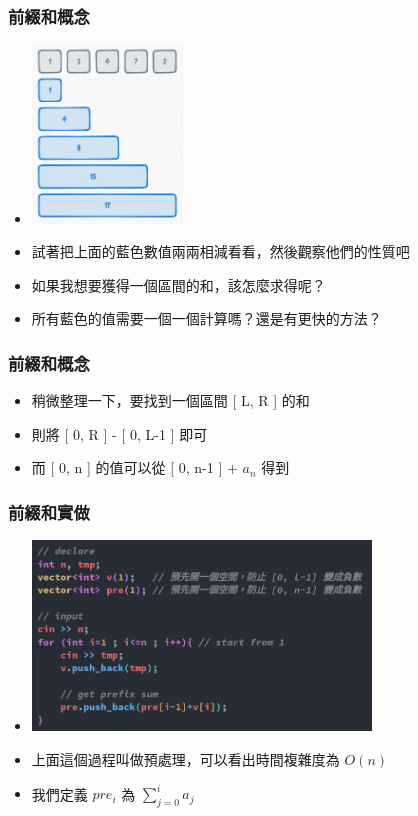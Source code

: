 \documentclass[mathserif]{beamer}
\begin{document}
\begin{frame}
    \frametitle{前綴和概念}
    \begin{itemize}
        \item \includegraphics[width=4.0cm]{img/6-3.png}
        \item 試著把上面的藍色數值兩兩相減看看，然後觀察他們的性質吧
        \item 如果我想要獲得一個區間的和，該怎麼求得呢？
        \item 所有藍色的值需要一個一個計算嗎？還是有更快的方法？
    \end{itemize}
\end{frame}

\begin{frame}
    \frametitle{前綴和概念}
    \begin{itemize}
        \item 稍微整理一下，要找到一個區間 [ L, R ] 的和
        \item 則將 [ 0, R ] - [ 0, L-1 ] 即可
        \item 而 [ 0, n ] 的值可以從 [ 0, n-1 ] + $a_n$ 得到
    \end{itemize}
\end{frame}

\begin{frame}
    \frametitle{前綴和實做}
    \begin{itemize}
        \item \includegraphics[width=9.0cm]{img/6-4.png}
        \item 上面這個過程叫做預處理，可以看出時間複雜度為 $O(n)$
        \item 我們定義 $pre_i$ 為 $\displaystyle\sum_{j=0}^{i} a_j$
    \end{itemize}
\end{frame}
\end{document}
